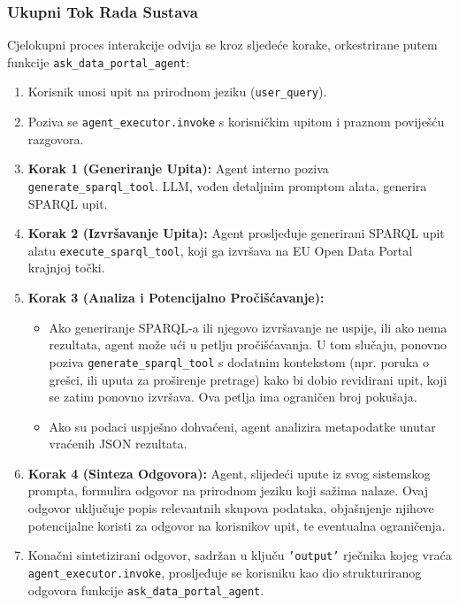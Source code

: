 \subsubsection{Ukupni Tok Rada Sustava}
\label{sec:llm_agent_workflow_sparql}
Cjelokupni proces interakcije odvija se kroz sljedeće korake, orkestrirane putem funkcije \texttt{ask\_data\_portal\_agent}:
\begin{enumerate}
    \item Korisnik unosi upit na prirodnom jeziku (\texttt{user\_query}).
    \item Poziva se \texttt{agent\_executor.invoke} s korisničkim upitom i praznom poviješću razgovora.
    \item \textbf{Korak 1 (Generiranje Upita):} Agent interno poziva \texttt{generate\_sparql\_tool}. LLM, vođen detaljnim promptom alata, generira SPARQL upit.
    \item \textbf{Korak 2 (Izvršavanje Upita):} Agent prosljeđuje generirani SPARQL upit alatu \texttt{execute\_sparql\_tool}, koji ga izvršava na EU Open Data Portal krajnjoj točki.
    \item \textbf{Korak 3 (Analiza i Potencijalno Pročišćavanje):}
    \begin{itemize}
        \item Ako generiranje SPARQL-a ili njegovo izvršavanje ne uspije, ili ako nema rezultata, agent može ući u petlju pročišćavanja. U tom slučaju, ponovno poziva \texttt{generate\_sparql\_tool} s dodatnim kontekstom (npr. poruka o grešci, ili uputa za proširenje pretrage) kako bi dobio revidirani upit, koji se zatim ponovno izvršava. Ova petlja ima ograničen broj pokušaja.
        \item Ako su podaci uspješno dohvaćeni, agent analizira metapodatke unutar vraćenih JSON rezultata.
    \end{itemize}
    \item \textbf{Korak 4 (Sinteza Odgovora):} Agent, slijedeći upute iz svog sistemskog prompta, formulira odgovor na prirodnom jeziku koji sažima nalaze. Ovaj odgovor uključuje popis relevantnih skupova podataka, objašnjenje njihove potencijalne koristi za odgovor na korisnikov upit, te eventualna ograničenja.
    \item Konačni sintetizirani odgovor, sadržan u ključu \texttt{'output'} rječnika kojeg vraća \texttt{agent\_executor.invoke}, prosljeđuje se korisniku kao dio strukturiranog odgovora funkcije \texttt{ask\_data\_portal\_agent}.
\end{enumerate}

